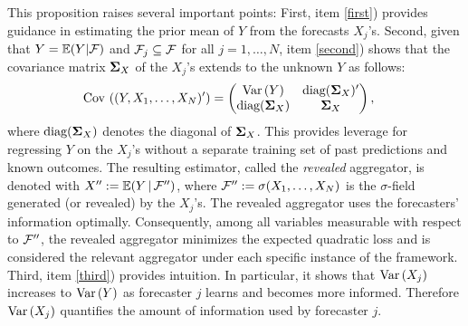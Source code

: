 \documentclass[11pt]{article}
\renewcommand{\P}{\mathbb{P}}
\newcommand{\E}{\mathbb{E}}
\theoremstyle{definition}
\theoremstyle{definition}
\def\bSigma{{\bf \Sigma}}
\def\F{{\cal F}}
\def\P{{\mathbb P}}
\def\E{{\mathbb E}}
\def\Var{{\rm Var}\,}
\def\Cov{{\rm Cov}\,}
\def\|{\, | \,}
\def\diag{\text{diag}}
\def\diag{\text{diag}}
\begin{document}
This proposition raises several important points: First, item \ref{first}) provides guidance in estimating the prior mean of $Y$ from the forecasts $X_j$'s. 
%
Second, given that $Y = \E(Y | \F)$ and $\F_j \subseteq \F$ for all $j = 1, \dots, N$, item \ref{second}) shows that the covariance matrix $\bSigma_X$ of the $X_j$'s extends to the unknown $Y$ as follows:
\begin{align}
\Cov\left((Y, X_1, \dots, X_N)'\right) &=  \left( \begin{matrix} 
 \Var(Y)  & \diag(\bSigma_X)'  \\
\diag(\bSigma_X) & \bSigma_X \\
\end{matrix} \right), \label{cov_str}
\end{align}
where $\diag(\bSigma_X)$ denotes the diagonal of $\bSigma_X$.
%
This provides leverage for regressing $Y$ on the $X_j$'s without a separate training set of past predictions and known outcomes. The resulting estimator, called the \textit{revealed} aggregator, is denoted with $X'' := \E (Y \|
\F'')$, where $\F'' := \sigma(X_1, \dots, X_N)$ is the $\sigma$-field generated (or revealed) by the
$X_j$'s. The revealed aggregator uses the forecasters' information optimally. Consequently, among all variables measurable with respect to $\F''$, the revealed aggregator minimizes the expected quadratic loss and is considered the relevant aggregator under each specific instance of the framework. Third, item \ref{third}) provides intuition. In particular, it shows that $\Var(X_j)$ increases to $\Var(Y)$ as forecaster $j$  learns and becomes more informed.  Therefore $\Var(X_j)$ quantifies the amount of information used by forecaster $j$. 
\end{document}
